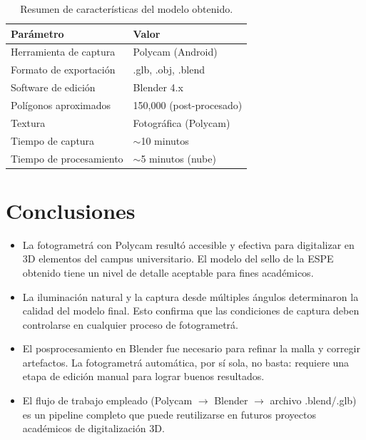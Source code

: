 \documentclass[12pt,a4paper]{article}
\begin{document}
\begin{table}[H]
\centering
\caption{Resumen de caracter\'isticas del modelo obtenido.}
\vspace{0.3cm}
\begin{tabular}{|l|l|}
\hline
\textbf{Par\'ametro} & \textbf{Valor} \\ \hline
Herramienta de captura & Polycam (Android) \\ \hline
Formato de exportaci\'on & .glb, .obj, .blend \\ \hline
Software de edici\'on & Blender 4.x \\ \hline
Pol\'igonos aproximados & 150,000 (post-procesado) \\ \hline
Textura & Fotogr\'afica (Polycam) \\ \hline
Tiempo de captura & $\sim$10 minutos \\ \hline
Tiempo de procesamiento & $\sim$5 minutos (nube) \\ \hline
\end{tabular}
\end{table}

\section{Conclusiones}

\begin{itemize}
    \item La fotogrametr\'a con Polycam result\'o accesible y efectiva para digitalizar en 3D elementos del campus universitario. El modelo del sello de la ESPE obtenido tiene un nivel de detalle aceptable para fines acad\'emicos.
    \item La iluminaci\'on natural y la captura desde m\'ultiples \'angulos determinaron la calidad del modelo final. Esto confirma que las condiciones de captura deben controlarse en cualquier proceso de fotogrametr\'a.
    \item El posprocesamiento en Blender fue necesario para refinar la malla y corregir artefactos. La fotogrametr\'a autom\'atica, por s\'i sola, no basta: requiere una etapa de edici\'on manual para lograr buenos resultados.
    \item El flujo de trabajo empleado (Polycam $\rightarrow$ Blender $\rightarrow$ archivo .blend/.glb) es un pipeline completo que puede reutilizarse en futuros proyectos acad\'emicos de digitalizaci\'on 3D.
\end{itemize}
\end{document}
